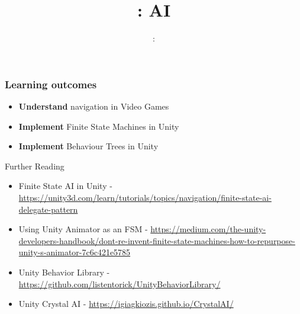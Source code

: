 \usepackage{../../beamerthemeFalmouthGamesAcademy}
\usepackage{multimedia}
\graphicspath{ {../../} }


\usepackage[normalem]{ulem}
\usepackage{wasysym}

\usepackage{pdfpages}

\usetikzlibrary{arrows,automata}

\usepackage{qtree}





\title{\sessionnumber: AI}
\subtitle{\modulecode: \moduletitle}

\frame{\titlepage} 

\begin{frame}
	\frametitle{Learning outcomes}
	\begin{itemize}
		\item \textbf{Understand} navigation in Video Games
		\item \textbf{Implement} Finite State Machines in Unity
		\item \textbf{Implement} Behaviour Trees in Unity
	\end{itemize}
\end{frame}






\begin{frame}{Further Reading}
	\begin{itemize}
		\item Finite State AI in Unity - \url{https://unity3d.com/learn/tutorials/topics/navigation/finite-state-ai-delegate-pattern}
		\item Using Unity Animator as an FSM - \url{https://medium.com/the-unity-developers-handbook/dont-re-invent-finite-state-machines-how-to-repurpose-unity-s-animator-7c6c421e5785}
		\item Unity Behavior Library - \url{https://github.com/listentorick/UnityBehaviorLibrary/}
		\item Unity Crystal AI - \url{https://igiagkiozis.github.io/CrystalAI/}
	\end{itemize}
\end{frame}
